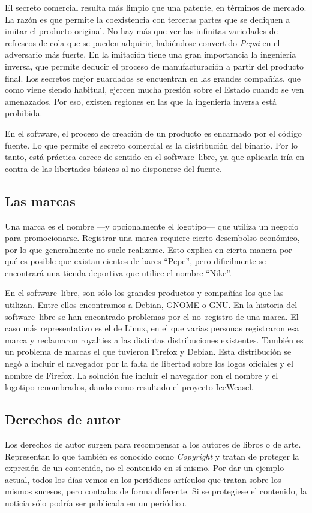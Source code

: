 El secreto comercial resulta más limpio que una patente, en términos
de mercado. La razón es que permite la coexistencia con terceras
partes que se dediquen a imitar el producto original. No hay más que
ver las infinitas variedades de refrescos de cola que se pueden
adquirir, habiéndose convertido \emph{Pepsi} en el adversario más
fuerte. En la imitación tiene una gran importancia la ingeniería
inversa, que permite deducir el proceso de manufacturación a partir
del producto final. Los secretos mejor guardados se encuentran en las
grandes compañías, que como viene siendo habitual, ejercen mucha
presión sobre el Estado cuando se ven amenazados. Por eso, existen
regiones en las que la ingeniería inversa está prohibida.

En el software, el proceso de creación de un producto es encarnado por
el código fuente. Lo que permite el secreto comercial es la
distribución del binario. Por lo tanto, está práctica carece de
sentido en el software~libre, ya que aplicarla iría en contra de las
libertades básicas al no disponerse del fuente.

\subsection{Las marcas}
Una marca es el nombre ---y opcionalmente el logotipo--- que utiliza
un negocio para promocionarse. Registrar una marca requiere cierto
desembolso económico, por lo que generalmente no suele
realizarse. Esto explica en cierta manera por qué es posible que
existan cientos de bares ``Pepe'', pero dificilmente se encontrará una
tienda deportiva que utilice el nombre ``Nike''.

En el software~libre, son sólo los grandes productos y compañías los
que las utilizan. Entre ellos encontramos a Debian, GNOME o GNU. En la
historia del software~libre se han encontrado problemas por el
no~registro de una marca. El caso más representativo es el de Linux,
en el que varias personas registraron esa marca y reclamaron royalties
a las distintas distribuciones existentes. También es un problema de
marcas el que tuvieron Firefox y Debian. Esta distribución se negó a
incluir el navegador por la falta de libertad sobre los logos
oficiales y el nombre de Firefox. La solución fue incluir el navegador
con el nombre y el logotipo renombrados, dando como resultado el
proyecto IceWeasel.

\subsection{Derechos de autor}
Los derechos de autor surgen para recompensar a los autores de libros
o de arte. Representan lo que también es conocido como
\emph{Copyright} y tratan de proteger la expresión de un contenido, no
el contenido en sí mismo. Por dar un ejemplo actual, todos los días
vemos en los periódicos artículos que tratan sobre los mismos sucesos,
pero contados de forma diferente. Si se protegiese el contenido, la
noticia sólo podría ser publicada en un periódico.

